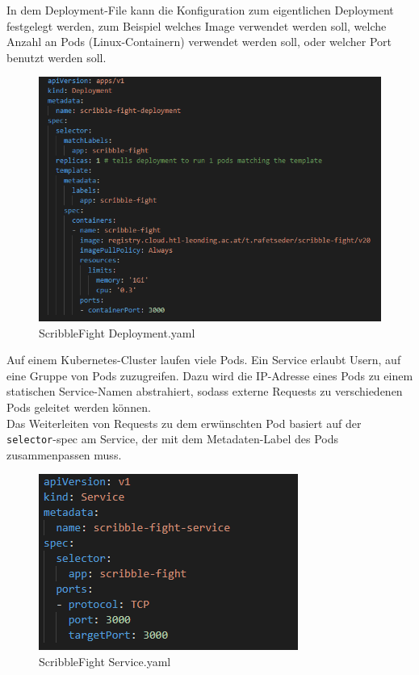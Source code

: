 In dem Deployment-File kann die Konfiguration zum eigentlichen Deployment festgelegt werden, zum Beispiel welches Image verwendet werden soll,
welche Anzahl an Pods (Linux-Containern) verwendet werden soll, oder welcher Port benutzt werden soll.

\begin{figure}[H]
    \centering
    \includegraphics[scale=0.85]{pics/deployment.PNG}
    \caption{ScribbleFight Deployment.yaml}
\end{figure}

Auf einem Kubernetes-Cluster laufen viele Pods. Ein Service erlaubt Usern, auf eine Gruppe von Pods zuzugreifen.
Dazu wird die IP-Adresse eines Pods zu einem statischen Service-Namen abstrahiert, sodass externe Requests zu verschiedenen Pods geleitet werden können.
\\
Das Weiterleiten von Requests zu dem erwünschten Pod basiert auf der \texttt{selector}-spec am Service, der mit dem Metadaten-Label des Pods zusammenpassen muss.

\begin{figure}[H]
    \centering
    \includegraphics[scale=1]{pics/service.PNG}
    \caption{ScribbleFight Service.yaml}
\end{figure}

